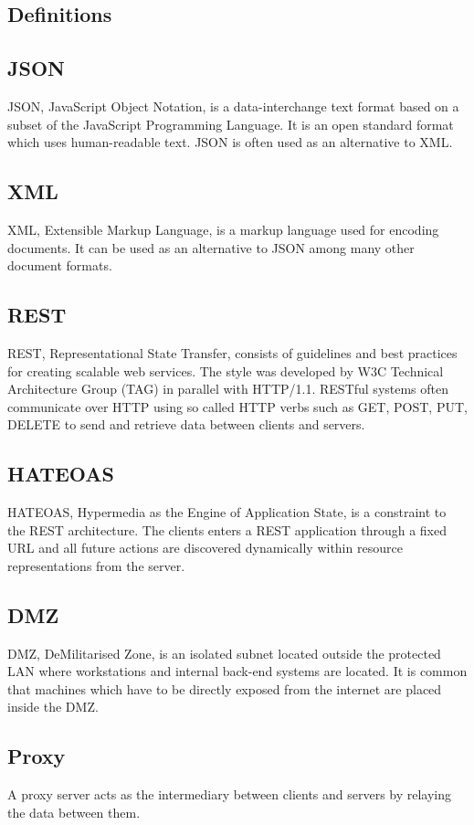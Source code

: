 \documentclass{cslthse-msc}
\begin{document}
\begin{appendices}
\chapter{Definitions}
\section{JSON}
JSON, JavaScript Object Notation, is a data-interchange text format based on a subset of the JavaScript Programming Language. It is an open standard format which uses human-readable text. JSON is often used as an alternative to XML.

\section{XML}
XML, Extensible Markup Language, is a markup language used for encoding documents. It can be used as an alternative to JSON among many other document formats.

\section{REST}
REST, Representational State Transfer, consists of guidelines and best practices for creating scalable web services. The style was developed by W3C Technical Architecture Group (TAG) in parallel with HTTP/1.1. RESTful systems often communicate over HTTP using so called HTTP verbs such as GET, POST, PUT, DELETE to send and retrieve data between clients and servers.

\section{HATEOAS}
HATEOAS, Hypermedia as the Engine of Application State, is a constraint to the REST architecture. The clients enters a REST application through a fixed URL and all future actions are discovered dynamically within resource representations from the server.

\section{DMZ}
DMZ, DeMilitarised  Zone, is an isolated subnet located outside the protected LAN where workstations and internal back-end systems are located. It is common that machines which have to be directly exposed from the internet are placed inside the DMZ.

\section{Proxy}
A proxy server acts as the intermediary between clients and servers by relaying the data between them.

\end{appendices}

\end{document}
